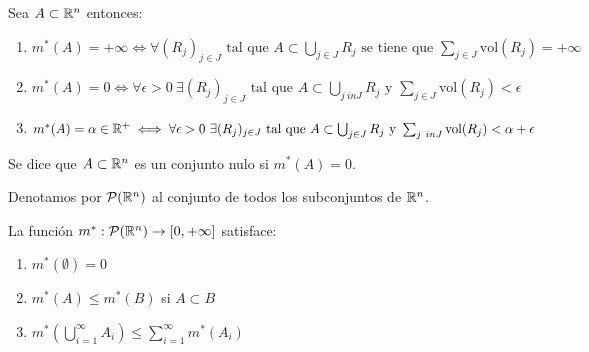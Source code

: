 \begin{observación}
Sea $A \subset \mathbb{R}^n$ entonces:
\vspace{-0.5em}
\begin{enumerate}
    \item $m^*(A) = +\infty \iff \forall (R_j)_{j \in J} \text{ tal que } A \subset \bigcup_{j \in J} R_j \text{ se tiene que } \sum_{j \in J} \text{vol}(R_j) = +\infty$
    \item $m^*(A) = 0 \iff \forall \epsilon > 0 \ \exists (R_j)_{j \in J} \text{ tal que } A \subset \bigcup_{j \ in J} R_j \text{ y } \sum_{j \in J} \text{vol}(R_j) < \epsilon$
    \item $m^*(A) = \alpha \in \mathbb{R}^+ \iff \forall \epsilon > 0 \ \exists (R_j)_{j \in J} \text{ tal que } A \subset \bigcup_{j \in J} R_j \text{ y } \sum_{j \ in J} \text{vol}(R_j) < \alpha + \epsilon$
\end{enumerate}
\end{observación}

\begin{definición}
Se dice que $A \subset \mathbb{R}^n$ es un conjunto nulo si $m^*(A) = 0$.
\end{definición}


Denotamos por $\mathcal{P}(\mathbb{R}^n)$ al conjunto de todos los subconjuntos de
$\mathbb{R}^n$.
\begin{teorema}
    La función $m^* : \mathcal{P}(\mathbb{R}^n) \to [0, +\infty]$ satisface:
    \vspace{-0.5em}
    \begin{enumerate}
        \item $m^*(\emptyset) = 0$
        \item $m^*(A) \leq m^*(B)$ si $A \subset B$
        \item $m^*(\bigcup_{i=1}^\infty A_i) \leq \sum_{i=1}^\infty m^*(A_i)$
    \end{enumerate}
    \label{funcionMedida}
\end{teorema}

